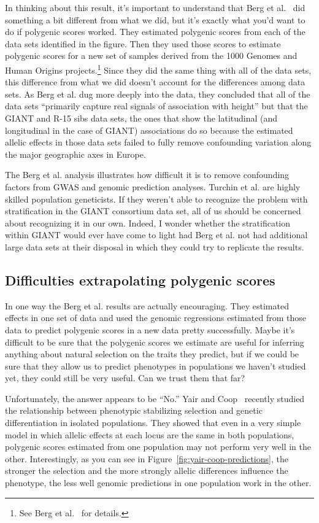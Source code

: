 \documentclass[12pt]{article}
\begin{document}
In thinking about this result, it's important to understand that Berg
et al.~\cite{Berg-etal-2018} did something a bit different from what
we did, but it's exactly what you'd want to do if polygenic scores
worked. They estimated polygenic scores from each of the data sets
identified in the figure. Then they used those scores to estimate
polygenic scores for a new set of samples derived from the 1000
Genomes and Human Origins projects.\footnote{See Berg et
  al.~\cite{Berg-etal-2018} for details.} Since they did the same
thing with all of the data sets, this difference from what we did
doesn't account for the differences among data sets. As Berg et
al. dug more deeply into the data, they concluded that all of the data
sets ``primarily capture real signals of association with height'' but
that the GIANT and R-15 sibs data sets, the ones that show the
latitudinal (and longitudinal in the case of GIANT) associations do so
because the estimated allelic effects in those data sets failed to
fully remove confounding variation along the major geographic axes in
Europe.

The Berg et al. analysis illustrates how difficult it is to remove
confounding factors from GWAS and genomic prediction
analyses. Turchin et al. are highly skilled population geneticists. If
they weren't able to recognize the problem with stratification in the
GIANT consortium data set, all of us should be concerned about
recognizing it in our own. Indeed, I wonder whether the stratification
within GIANT would ever have come to light had Berg et al. not had
additional large data sets at their disposal in which they could try
to replicate the results.

\subsection*{Difficulties extrapolating polygenic scores}

In one way the Berg et al. results are actually encouraging. They
estimated effects in one set of data and used the genomic regressions
estimated from those data to predict polygenic scores in a new data
pretty successfully. Maybe it's difficult to be sure that the
polygenic scores we estimate are useful for inferring anything about
natural selection on the traits they predict, but if we could be sure
that they allow us to predict phenotypes in populations we haven't
studied yet, they could still be very useful. Can we trust them that
far?

Unfortunately, the answer appears to be ``No.'' Yair and
Coop~\cite{Yair-Coop-2021} recently studied the relationship between
phenotypic stabilizing selection and genetic differentiation in
isolated populations. They showed that even in a very simple model in
which allelic effects at each locus are the same in both populations,
polygenic scores estimated from one population may not perform very
well in the other. Interestingly, as you can see in
Figure~\ref{fig:yair-coop-predictions}, the stronger the selection and
the more strongly allelic differences influence the phenotype, the less
well genomic predictions in one population work in the other.
\end{document}
